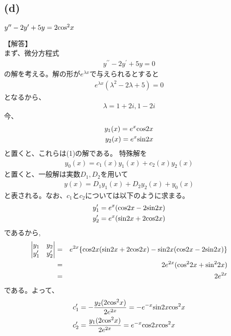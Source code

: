 \documentclass[pdflatex,ja=standard,fleqn]{bxjsarticle}
\begin{document}
\subsection*{(d)}
\begin{screen}
    $y^{\prime\prime}-2y^{\prime}+5y=2{\rm cos^2}x$ 
\end{screen}
【解答】\\
まず、微分方程式
\begin{eqnarray}y^{\prime\prime}-2y^{\prime}+5y=0\end{eqnarray}
の解を考える。解の形が$e^{\lambda x}$で与えられるとすると
\begin{eqnarray*}e^{\lambda x}(\lambda^2-2\lambda+5)=0\end{eqnarray*}
となるから、
\begin{eqnarray*}\lambda=1+2i,1-2i\end{eqnarray*}
今、
\begin{eqnarray*}y_{1}(x)=e^{x}{\rm cos}2x\\y_{2}(x)=e^{x}{\rm sin}2x\end{eqnarray*}
と置くと、これらは(1)の解である。
特殊解を
\begin{eqnarray*}y_{0}(x)=c_{1}(x)y_{1}(x)+c_{2}(x)y_{2}(x)\end{eqnarray*}
と置くと、一般解は実数$D_{1},D_{2}$を用いて
\begin{eqnarray*}
    y(x)=D_{1}y_{1}(x)+D_{2}y_{2}(x)+y_{0}(x)
\end{eqnarray*}
と表される。なお、$c_{1}$と$c_{2}$については以下のように求まる。
\begin{align*}
    &y_{1}^{\prime}=e^{x}({\rm cos}2x-2{\rm sin}2x)\\
    &y_{2}^{\prime}=e^{x}({\rm sin}2x+2{\rm cos}2x)
\end{align*}
であるから,
\begin{eqnarray*}
\begin{vmatrix}y_{1}&y_{2}\\y_{1}^{\prime}&y_{2}^{\prime}\end{vmatrix}
&=&e^{2x}{\lbrace{\rm cos}2x({\rm sin}2x+2{\rm cos}2x)-{\rm sin}2x({\rm cos}2x-2{\rm sin}2x)}\rbrace \\
&=&2e^{2x}({\rm cos^2}2x+{\rm sin^2}2x) \\
&=&2e^{2x}
\end{eqnarray*}
である。よって、
\begin{align*}
    &c_{1}^{\prime}=-\frac{y_{2}(2{\rm cos^2}x)}{2e^{2x}}=-e^{-x}{\rm sin}2x{\rm cos^2}x\\
    &c_{2}^{\prime}=\frac{y_{1}(2{\rm cos^2}x)}{2e^{2x}}=e^{-x}{\rm cos}2x{\rm cos^2}x
\end{align*}
\end{document}
